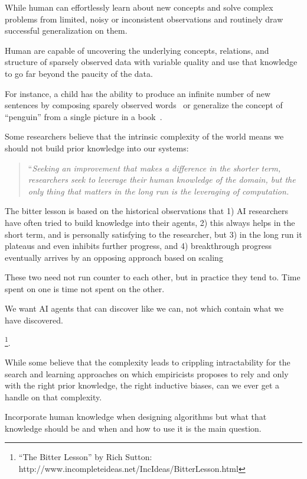 While human can effortlessly learn about new concepts and solve complex problems from limited, noisy or inconsistent observations and routinely draw successful generalization on them.

Human are capable of uncovering the underlying concepts, relations, and structure of sparsely observed data with variable quality and use that knowledge to go far beyond the paucity of the data.

For instance, a child has the ability to produce an infinite number of new sentences by composing sparely observed words~\citep{lake2017building} or generalize the concept of ``penguin'' from a single picture in a book~\citep{vinyals2016matching}. 







% 
Some researchers believe that the intrinsic complexity of the world means we should not build prior knowledge into our systems:
\begin{quote}
``\emph{Seeking an improvement that makes a difference in the shorter term, researchers seek to leverage their human knowledge of the domain, but the only thing that matters in the long run is the leveraging of computation.}
\end{quote}


 The bitter lesson is based on the historical observations that 1) AI researchers have often tried to build knowledge into their agents, 2) this always helps in the short term, and is personally satisfying to the researcher, but 3) in the long run it plateaus and even inhibits further progress, and 4) breakthrough progress eventually arrives by an opposing approach based on scaling 


These two need not run counter to each other, but in practice they tend to. Time spent on one is time not spent on the other.


We want AI agents that can discover like we can, not which contain what we have discovered. 

\footnote{``The Bitter Lesson'' by Rich Sutton: http://www.incompleteideas.net/IncIdeas/BitterLesson.html}.  

While some believe that the complexity leads to crippling intractability for the search and learning approaches on which empiricists proposes to rely and only with the right prior knowledge, the right inductive biases, can we ever get a handle on that complexity.

Incorporate human knowledge when designing algorithms  but what that knowledge should be and when and how to use it is the main question.

